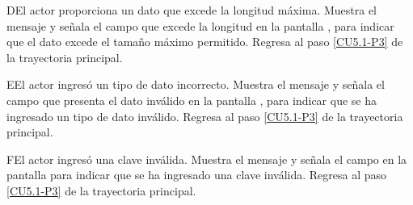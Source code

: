 	\begin{UCtrayectoriaA}{D}{El actor proporciona un dato que excede la longitud máxima.}
		\UCpaso[\UCsist] Muestra el mensaje  y señala el campo que excede la longitud en la pantalla , para indicar que el dato excede el tamaño máximo permitido.
		\UCpaso Regresa al paso \ref{CU5.1-P3} de la trayectoria principal.
	\end{UCtrayectoriaA}

	\begin{UCtrayectoriaA}{E}{El actor ingresó un tipo de dato incorrecto.}
		\UCpaso[\UCsist] Muestra el mensaje  y señala el campo que presenta el dato inválido en la pantalla , para indicar que se ha ingresado un tipo de dato inválido.
		\UCpaso Regresa al paso \ref{CU5.1-P3} de la trayectoria principal.
	\end{UCtrayectoriaA}

	\begin{UCtrayectoriaA}{F}{El actor ingresó una clave inválida.}
		\UCpaso[\UCsist] Muestra el mensaje  y señala el campo en la pantalla  para indicar que se ha ingresado una clave inválida.
		\UCpaso Regresa al paso \ref{CU5.1-P3} de la trayectoria principal.
	\end{UCtrayectoriaA}

